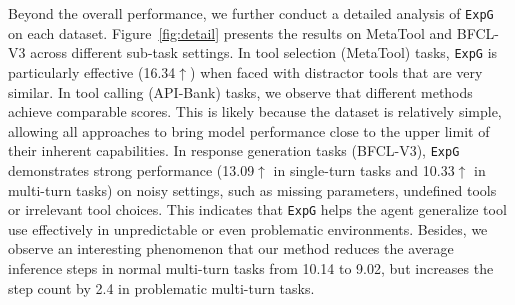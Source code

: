 \documentclass[11pt]{article}
\newcommand{\ours}{\texttt{ExpG}}
\begin{document}
Beyond the overall performance, we further conduct a detailed analysis of {\ours} on each dataset. 
Figure~\ref{fig:detail} presents the results on MetaTool and BFCL-V3 across different sub-task settings. 
In tool selection (MetaTool) tasks, {\ours} is particularly effective ({\setlength{\fboxsep}{0.5pt}\colorbox{gainbg}{16.34$\uparrow$}}) when faced with distractor tools that are very similar. 
In tool calling (API-Bank) tasks, we observe that different methods achieve comparable scores. 
This is likely because the dataset is relatively simple, allowing all approaches to bring model performance close to the upper limit of their inherent capabilities. 
In response generation tasks (BFCL-V3), {\ours} demonstrates strong performance ({\setlength{\fboxsep}{0.5pt}\colorbox{gainbg}{13.09$\uparrow$}} in single-turn tasks and {\setlength{\fboxsep}{0.5pt}\colorbox{gainbg}{10.33$\uparrow$}} in multi-turn tasks) on noisy settings, such as missing parameters, undefined tools or irrelevant tool choices. 
This indicates that {\ours} helps the agent generalize tool use effectively in unpredictable or even problematic environments.
Besides, we observe an interesting phenomenon that our method reduces the average inference steps in normal multi-turn tasks from 10.14 to 9.02, but increases the step count by 2.4 in problematic multi-turn tasks. 
\end{document}
